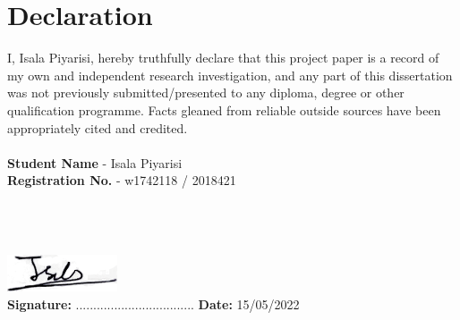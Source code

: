 \chapter*{Declaration}

I, Isala Piyarisi, hereby truthfully declare that this project paper is a record of my own and independent research investigation, and any part of this dissertation was not previously submitted/presented to any diploma, degree or other qualification programme. Facts gleaned from reliable outside sources have been appropriately cited and credited.
\\
\\
\noindent\textbf{Student Name} - Isala Piyarisi \\
\textbf{Registration No.} - w1742118 / 2018421
\\
\\
\\
\\
\begin{spacing}{0}
\hspace*{8px} \includegraphics[height=1.1cm]{assets/signature.png}\\
\textbf{Signature:} ..................................
\hfill 
\textbf{Date:} 15/05/2022
\end{spacing}
